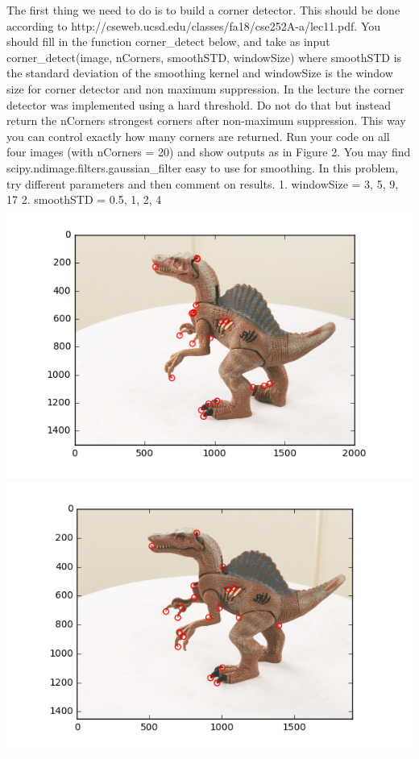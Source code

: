 \documentclass[11pt]{article}
\makeatletter
\def\maxwidth{\ifdim\Gin@nat@width>\linewidth\linewidth
    \else\Gin@nat@width\fi}
\let\Oldincludegraphics\includegraphics
\renewcommand{\includegraphics}[1]{\Oldincludegraphics[width=.8\maxwidth]{#1}}
\makeatother
\begin{document}
The first thing we need to do is to build a corner detector. This should
be done according to
http://cseweb.ucsd.edu/classes/fa18/cse252A-a/lec11.pdf. You should fill
in the function corner\_detect below, and take as input
corner\_detect(image, nCorners, smoothSTD, windowSize) where smoothSTD
is the standard deviation of the smoothing kernel and windowSize is the
window size for corner detector and non maximum suppression. In the
lecture the corner detector was implemented using a hard threshold. Do
not do that but instead return the nCorners strongest corners after
non-maximum suppression. This way you can control exactly how many
corners are returned. Run your code on all four images (with nCorners =
20) and show outputs as in Figure 2. You may find
scipy.ndimage.filters.gaussian\_filter easy to use for smoothing. In
this problem, try different parameters and then comment on results. 1.
windowSize = 3, 5, 9, 17 2. smoothSTD = 0.5, 1, 2, 4
\includegraphics{fig/dinoCorner1.png}
\includegraphics{fig/dinoCorner2.png}
\end{document}
